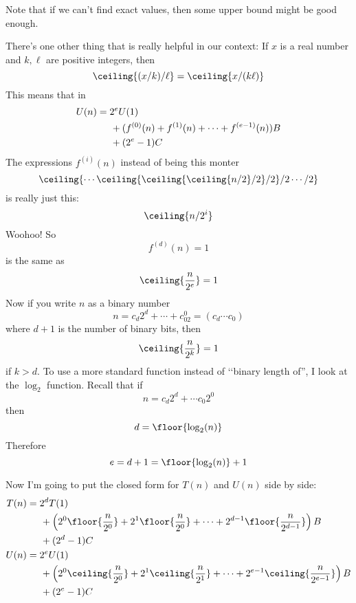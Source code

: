 Note that if we can't find exact values, then some upper bound might be good
enough.

There's one other thing that is really helpful in our context:
If $x$ is a real number and $k,\ell$ are positive integers, then
\[
\ceiling{(x/k)/\ell}
=
\ceiling{x / (k \ell)}
\]
This means that in
\begin{align*}
U(n) 
&= 2^e U(1) \\
&\hspace{0.5cm} + (f^{(0)}(n) + f^{(1)}(n) + \cdots + f^{(e-1)}(n))B \\
&\hspace{0.5cm} + (2^e - 1)C
\end{align*}
The expressions $f^{(i)}(n)$ instead of being this monter
\[
\ceiling{
\cdots
\ceiling{
\ceiling{
\ceiling{
n/2
}/2
}/2
}/2
\cdots
/2}
\]
is really just this:
\[
\ceiling{n/2^i}
\]
Woohoo!
So 
\[
f^{(d)}(n) = 1
\]
is the same as
\[
\ceiling{ \frac{n}{2^e} } = 1
\]
Now if you write $n$ as a binary number
\[
n = c_d2^d + \cdots + c_02^0 = (c_d \cdots c_0)
\]
where $d + 1$ is the number of binary bits, then
\[
\ceiling{ \frac{n}{2^k} } = 1
\]
if $k > d$.
To use a more standard function instead of \lq\lq binary length of'',
I look at the $\log_2$ function.
Recall that if
\[
n = c_d 2^d + \cdots c_0 2^0
\]
then
\[
d = \floor{ \log_2(n) }
\]
Therefore
\[
e = d + 1 = \floor{ \log_2(n) } + 1
\]


Now I'm going to put the closed form for $T(n)$ and 
$U(n)$ side by side:
\begin{align*}
T(n) 
&= 2^d T(1) \\
&\hspace{0.5cm} + \left( 
                  2^0 \floor{\frac{n}{2^0}} 
                  +  2^1 \floor{\frac{n}{2^0}} 
                  + \cdots 
                  + 2^{d-1} \floor{\frac{n}{2^{d-1}}}
                  \right) B \\
&\hspace{0.5cm} + (2^{d} - 1)C 
\\
U(n)
&= 2^e U(1) \\
&\hspace{0.5cm} + \left(
                   2^0 \ceiling{\frac{n}{2^0}} 
                   + 2^1 \ceiling{\frac{n}{2^1}} 
                   + \cdots 
                   + 2^{e-1} \ceiling{\frac{n}{2^{e-1}}} 
                  \right) B \\
&\hspace{0.5cm} + (2^e - 1)C
\end{align*}

